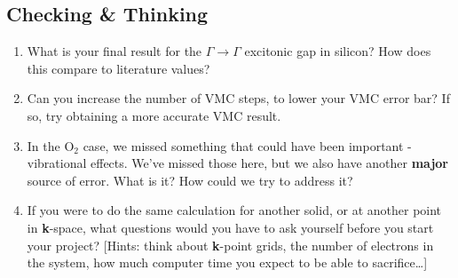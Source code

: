\documentclass[12pt, a4paper]{article}
\begin{document}
\subsection{Checking \& Thinking}\label{sub:checking_&_thinking_2}

\begin{enumerate}
  \item What is your final result for the $\Gamma \rightarrow \Gamma$ excitonic
  gap in silicon? How does this compare to literature values?

  \item Can you increase the number of VMC steps, to lower your VMC error bar?
  If so, try obtaining a more accurate VMC result.

  \item In the O$_2$ case, we missed something that could have been important -
  vibrational effects. We've missed those here, but we also have another
  \textbf{major} source of error. What is it? How could we try to address it?

  \item If you were to do the same calculation for another solid, or at
  another point in {\bf k}-space, what questions would you have to ask yourself
  before you start your project? [Hints: think about {\bf k}-point grids, the
  number of electrons in the system, how much computer time you expect to be
  able to sacrifice\ldots]
\end{enumerate}
\end{document}
